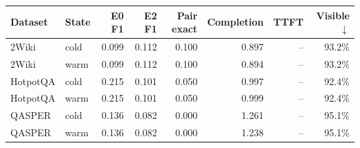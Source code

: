 \begin{tabular}{llrrrrrr}
\toprule
Dataset & State & E0 F1 & E2 F1 & Pair exact & Completion & TTFT & Visible $\downarrow$ \\
\midrule
2Wiki & cold & 0.099 & 0.112 & 0.100 & 0.897 & -- & 93.2\% \\
2Wiki & warm & 0.099 & 0.112 & 0.100 & 0.894 & -- & 93.2\% \\
HotpotQA & cold & 0.215 & 0.101 & 0.050 & 0.997 & -- & 92.4\% \\
HotpotQA & warm & 0.215 & 0.101 & 0.050 & 0.999 & -- & 92.4\% \\
QASPER & cold & 0.136 & 0.082 & 0.000 & 1.261 & -- & 95.1\% \\
QASPER & warm & 0.136 & 0.082 & 0.000 & 1.238 & -- & 95.1\% \\
\bottomrule
\end{tabular}
